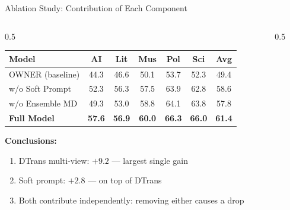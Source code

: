 \documentclass[aspectratio=169,10pt]{beamer}
\newcommand{\hg}[1]{\textcolor{dkgreen}{\textbf{#1}}}
\begin{document}
\begin{frame}{Ablation Study: Contribution of Each Component}
  \begin{columns}[T]
    \begin{column}{0.5\textwidth}
      \footnotesize
      \setlength{\tabcolsep}{3pt}
      \renewcommand{\arraystretch}{1.3}
      \begin{tabular}{l|ccccc|c}
        \toprule
        \textbf{Model} & AI & Lit & Mus & Pol & Sci & \textbf{Avg} \\
        \midrule
        OWNER (baseline) & 44.3 & 46.6 & 50.1 & 53.7 & 52.3 & 49.4 \\
        w/o Soft Prompt  & 52.3 & 56.3 & 57.5 & 63.9 & 62.8 & 58.6 \\
        w/o Ensemble MD  & 49.3 & 53.0 & 58.8 & 64.1 & 63.8 & 57.8 \\
        \rowcolor{gold!25}
        \textbf{Full Model} & \textbf{57.6} & \textbf{56.9} & \textbf{60.0} & \textbf{66.3} & \textbf{66.0} & \textbf{61.4} \\
        \bottomrule
      \end{tabular}
      \vspace{0.5em}
      \normalsize
      \textbf{Conclusions:}
      \begin{enumerate}
        \item DTrans multi-view: \hg{$+9.2$} — largest single gain
        \item Soft prompt: \hg{$+2.8$} — on top of DTrans
        \item Both contribute independently: removing either causes a drop
      \end{enumerate}
    \end{column}
    \begin{column}{0.5\textwidth}
\end{column}
\end{columns}
\end{frame}
\end{document}
